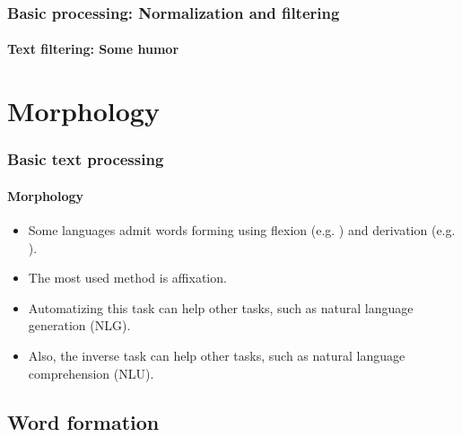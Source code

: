\documentclass[xcolor=table]{beamer}
\begin{document}
\begin{frame}
\frametitle{Basic processing: Normalization and filtering}
\framesubtitle{Text filtering: Some humor}

\begin{center}
\end{center}

\end{frame}

\section{Morphology}

\begin{frame}
\frametitle{Basic text processing}
\framesubtitle{Morphology}

\begin{itemize}
	\item Some languages admit words forming using flexion (e.g. ) and derivation (e.g. ).
	\item The most used method is affixation.
	\item Automatizing this task can help other tasks, such as natural language generation (NLG).
	\item Also, the inverse task can help other tasks, such as natural language comprehension (NLU).
\end{itemize}

\end{frame}

\subsection{Word formation}
\end{document}
